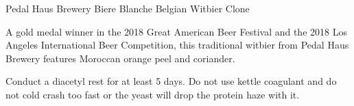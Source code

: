 \stylesection{\stylewitbier}

\begin{recipe}{Pedal Haus Brewery Biere Blanche Belgian Witbier Clone}

\begin{aboutblock}
A gold medal winner in the 2018 Great American Beer Festival and the 2018 Los
Angeles International Beer Competition, this traditional witbier from Pedal Haus
Brewery features Moroccan orange peel and coriander. \sourceaha
\end{aboutblock}


\begin{methodandtiming}
 
\begin{mashsteps}
\end{mashsteps}

\begin{fermentationsteps}
\end{fermentationsteps}

\begin{directions}
Conduct a diacetyl rest for at least 5 days. Do not use kettle coagulant and do
not cold crash too fast or the yeast will drop the protein haze with it.
\end{directions}

\end{methodandtiming}

\recipebreak

\begin{ingredientsblock}

\begin{malts}
\end{malts}

\begin{hops}
\end{hops}


\end{ingredientsblock}

\end{recipe}

